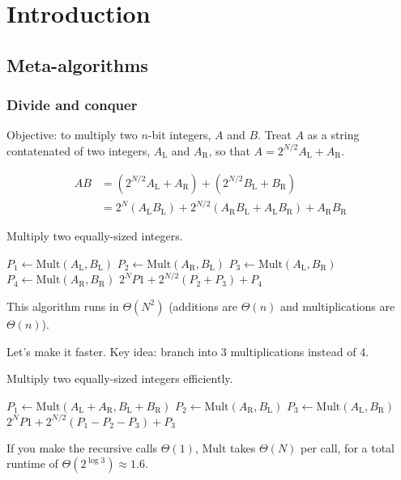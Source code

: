 \chapter{Introduction}
\section{Meta-algorithms}
\subsection{Divide and conquer}
Objective: to multiply two \(n\)-bit integers, \(A\) and \(B\).
Treat \(A\) as a string contatenated of two integers, \(A_\text{L}\) and \(A_\text{R}\),
so that \(A = 2^{N/2}A_\text{L} + A_\text{R}\).

\begin{align}
	AB &= \left(2^{N/2} A_\text{L} + A_\text{R}\right) + \left(2^{N/2} B_\text{L} + B_\text{R}\right) \\
		&= 2^N\left(A_\text{L}B_\text{L}\right) + 2^{N/2}\left(A_\text{R}B_\text{L} + A_\text{L}B_\text{R}\right) + A_\text{R}B_\text{R}
\end{align}

\begin{algorithm}
	\caption{Multiply two equally-sized integers.}
	\begin{algorithmic}
		\State \(P_1 \leftarrow \text{Mult}(A_\text{L}, B_\text{L})\)
		\State \(P_2 \leftarrow \text{Mult}(A_\text{R}, B_\text{L})\)
		\State \(P_3 \leftarrow \text{Mult}(A_\text{L}, B_\text{R})\)
		\State \(P_4 \leftarrow \text{Mult}(A_\text{R}, B_\text{R})\)
		\State\Return \(2^NP1 + 2^{N/2}\left(P_2 + P_3\right) + P_4\)
		\EndFunction
	\end{algorithmic}
\end{algorithm}

This algorithm runs in \(\Theta(N^2)\) (additions are \(\Theta(n)\) and multiplications are \(\Theta(n)\)).

Let's make it faster. Key idea: branch into 3 multiplications instead of 4.
\begin{algorithm}
	\caption{Multiply two equally-sized integers efficiently.}
	\begin{algorithmic}
		\Function{Mult}{$A,B$}
		\State \(P_1 \leftarrow \text{Mult}(A_\text{L} + A_\text{R}, B_\text{L} + B_\text{R})\)
		\State \(P_2 \leftarrow \text{Mult}(A_\text{R}, B_\text{L})\)
		\State \(P_3 \leftarrow \text{Mult}(A_\text{L}, B_\text{R})\)
		\State\Return \(2^NP1 + 2^{N/2}\left(P_1 - P_2 - P_3\right) + P_3\)
		\EndFunction
	\end{algorithmic}
\end{algorithm}

If you make the recursive calls \(\Theta(1)\), \(\text{Mult}\) takes \(\Theta(N)\) per call, for a total runtime of \(\Theta(2^{\log 3}) \approx 1.6\).
